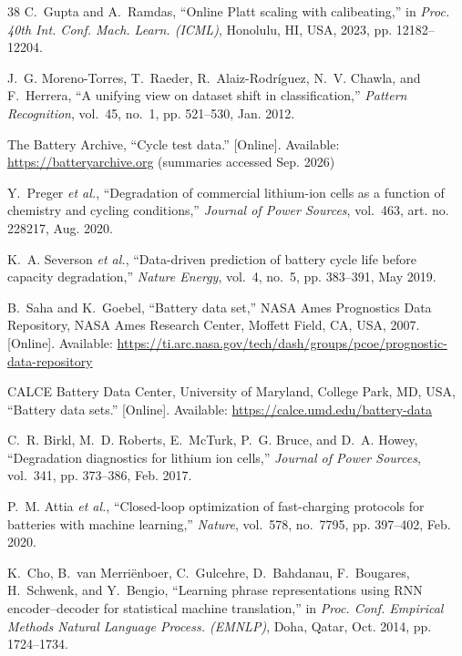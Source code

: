 \documentclass[11pt,a4paper]{article}
\begin{document}
\begin{thebibliography}{38}
C.~Gupta and A.~Ramdas, ``Online Platt scaling with calibeating,'' in \emph{Proc. 40th Int. Conf. Mach. Learn. (ICML)}, Honolulu, HI, USA, 2023, pp. 12182--12204.

J.~G. Moreno-Torres, T.~Raeder, R.~Alaiz-Rodr\'iguez, N.~V. Chawla, and F.~Herrera, ``A unifying view on dataset shift in classification,'' \emph{Pattern Recognition}, vol.~45, no.~1, pp. 521--530, Jan. 2012.

The Battery Archive, ``Cycle test data.'' [Online]. Available: \url{https://batteryarchive.org} (summaries accessed Sep. 2026)

Y.~Preger \emph{et al.}, ``Degradation of commercial lithium-ion cells as a function of chemistry and cycling conditions,'' \emph{Journal of Power Sources}, vol.~463, art. no. 228217, Aug. 2020.

K.~A. Severson \emph{et al.}, ``Data-driven prediction of battery cycle life before capacity degradation,'' \emph{Nature Energy}, vol.~4, no.~5, pp. 383--391, May 2019.

B.~Saha and K.~Goebel, ``Battery data set,'' NASA Ames Prognostics Data Repository, NASA Ames Research Center, Moffett Field, CA, USA, 2007. [Online]. Available: \url{https://ti.arc.nasa.gov/tech/dash/groups/pcoe/prognostic-data-repository}

CALCE Battery Data Center, University of Maryland, College Park, MD, USA, ``Battery data sets.'' [Online]. Available: \url{https://calce.umd.edu/battery-data}

C.~R. Birkl, M.~D. Roberts, E.~McTurk, P.~G. Bruce, and D.~A. Howey, ``Degradation diagnostics for lithium ion cells,'' \emph{Journal of Power Sources}, vol.~341, pp. 373--386, Feb. 2017.

P.~M. Attia \emph{et al.}, ``Closed-loop optimization of fast-charging protocols for batteries with machine learning,'' \emph{Nature}, vol.~578, no.~7795, pp. 397--402, Feb. 2020.

K.~Cho, B.~van Merri\"enboer, C.~Gulcehre, D.~Bahdanau, F.~Bougares, H.~Schwenk, and Y.~Bengio, ``Learning phrase representations using RNN encoder--decoder for statistical machine translation,'' in \emph{Proc. Conf. Empirical Methods Natural Language Process. (EMNLP)}, Doha, Qatar, Oct. 2014, pp. 1724--1734.


\end{thebibliography}
\end{document}

